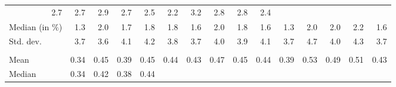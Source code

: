 \begin{tabular}{lllllllllllllll}
  \multicolumn{1}{r}{2.7} &
  \multicolumn{1}{r}{2.7} &
  \multicolumn{1}{r}{2.9} &
  \multicolumn{1}{r}{2.7} &
  \multicolumn{1}{r}{2.5} &
  \multicolumn{1}{r}{2.2} &
  \multicolumn{1}{r}{3.2} &
  \multicolumn{1}{r}{2.8} &
  \multicolumn{1}{r}{2.8} &
  \multicolumn{1}{r}{2.4} \\
\multicolumn{1}{l}{\hspace{2em}Median (in $\%$)} &
  \multicolumn{1}{|r}{1.3} &
  \multicolumn{1}{r}{2.0} &
  \multicolumn{1}{r}{1.7} &
  \multicolumn{1}{r}{1.8} &
  \multicolumn{1}{r}{1.8} &
  \multicolumn{1}{r}{1.6} &
  \multicolumn{1}{r}{2.0} &
  \multicolumn{1}{r}{1.8} &
  \multicolumn{1}{r}{1.6} &
  \multicolumn{1}{r}{1.3} &
  \multicolumn{1}{r}{2.0} &
  \multicolumn{1}{r}{2.0} &
  \multicolumn{1}{r}{2.2} &
  \multicolumn{1}{r}{1.6} \\
\multicolumn{1}{l}{\hspace{2em}Std. dev.} &
  \multicolumn{1}{|r}{3.7} &
  \multicolumn{1}{r}{3.6} &
  \multicolumn{1}{r}{4.1} &
  \multicolumn{1}{r}{4.2} &
  \multicolumn{1}{r}{3.8} &
  \multicolumn{1}{r}{3.7} &
  \multicolumn{1}{r}{4.0} &
  \multicolumn{1}{r}{3.9} &
  \multicolumn{1}{r}{4.1} &
  \multicolumn{1}{r}{3.7} &
  \multicolumn{1}{r}{4.7} &
  \multicolumn{1}{r}{4.0} &
  \multicolumn{1}{r}{4.3} &
  \multicolumn{1}{r}{3.7} \\
\multicolumn{1}{l}{\hspace{1em}{\textit{Share of additive costs} ($\widehat{\beta}$)}} &
  \multicolumn{1}{|r}{} &
  \multicolumn{1}{r}{} &
  \multicolumn{1}{r}{} &
  \multicolumn{1}{r}{} &
  \multicolumn{1}{r}{} &
  \multicolumn{1}{r}{} &
  \multicolumn{1}{r}{} &
  \multicolumn{1}{r}{} &
  \multicolumn{1}{r}{} &
  \multicolumn{1}{r}{} &
  \multicolumn{1}{r}{} &
  \multicolumn{1}{r}{} &
  \multicolumn{1}{r}{} &
  \multicolumn{1}{r}{} \\
\multicolumn{1}{l}{\hspace{2em}Mean} &
  \multicolumn{1}{|r}{0.34} &
  \multicolumn{1}{r}{0.45} &
  \multicolumn{1}{r}{0.39} &
  \multicolumn{1}{r}{0.45} &
  \multicolumn{1}{r}{0.44} &
  \multicolumn{1}{r}{0.43} &
  \multicolumn{1}{r}{0.47} &
  \multicolumn{1}{r}{0.45} &
  \multicolumn{1}{r}{0.44} &
  \multicolumn{1}{r}{0.39} &
  \multicolumn{1}{r}{0.53} &
  \multicolumn{1}{r}{0.49} &
  \multicolumn{1}{r}{0.51} &
  \multicolumn{1}{r}{0.43} \\
\multicolumn{1}{l}{\hspace{2em}Median} &
  \multicolumn{1}{|r}{0.34} &
  \multicolumn{1}{r}{0.42} &
  \multicolumn{1}{r}{0.38} &
  \multicolumn{1}{r}{0.44} &

\end{tabular}
